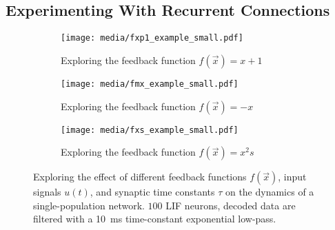 \documentclass[10pt,letterpaper,oneside]{article}
\begin{document}

\subsection{Experimenting With Recurrent Connections}


\begin{figure}
	\centering
	\begin{subfigure}{\textwidth}
		\centering
		\texttt{[image: media/fxp1\_example\_small.pdf]}\\[-0.25cm]
		\caption{Exploring the feedback function $f(\vec x) = x + 1$}
		\label{fig:dynamics_example_a}\vspace{0.25cm}
	\end{subfigure}
	\begin{subfigure}{\textwidth}
		\centering
		\texttt{[image: media/fmx\_example\_small.pdf]}\\[-0.25cm]
		\caption{Exploring the feedback function $f(\vec x) = -x$}
		\label{fig:dynamics_example_b}\vspace{0.25cm}
	\end{subfigure}
	\begin{subfigure}{\textwidth}
		\centering
		\texttt{[image: media/fxs\_example\_small.pdf]}\\[-0.25cm]
		\caption{Exploring the feedback function $f(\vec x) = x^2s$}
		\label{fig:dynamics_example_c}\vspace{0.25cm}
	\end{subfigure}
	\caption{Exploring the effect of different feedback functions $f(\vec x)$, input signals $u(t)$, and synaptic time constants $\tau$ on the dynamics of a single-population network. $100$ LIF neurons, decoded data are filtered with a \SI{10}{\milli\second} time-constant exponential low-pass.  }
	\label{fig:dynamics_example}
\end{figure}
\end{document}
